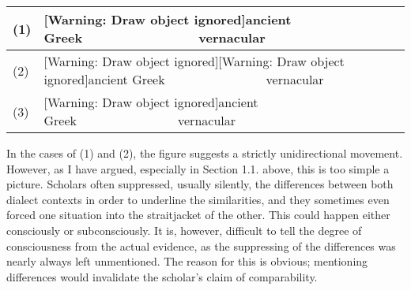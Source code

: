 \documentclass[12pt]{article}
\newenvironment{styleStandard}{\renewcommand\baselinestretch{1.25}\setlength\leftskip{0in}\setlength\rightskip{0in}\setlength\parindent{0.1972in}\setlength\parfillskip{0pt plus 1fil}\setlength\parskip{0in plus 1pt}\writerlistparindent\writerlistleftskip\leavevmode\normalfont\normalsize\writerlistlabel\ignorespaces}{\unskip\vspace{0in plus 1pt}\par}
\newcommand\writerlistleftskip{}
\newcommand\writerlistparindent{}
\newcommand\writerlistlabel{}
\begin{document}
\begin{flushleft}
\tablefirsthead{}
\tablehead{}
\tabletail{}
\tablelasttail{}
\begin{supertabular}{|m{0.35805985in}|m{5.48516in}|}
\hline
(1) &
[Warning: Draw object ignored]ancient Greek\ \ \ \ \ \ \ \ \ \ \ \ \ \ \ \ vernacular\\\hline
(2) &
[Warning: Draw object ignored][Warning: Draw object ignored]ancient Greek\ \ \ \ \ \ \ \ \ \ \ \ \ \ \ \ vernacular\\\hline
(3) &
[Warning: Draw object ignored]ancient Greek\ \ \ \ \ \ \ \ \ \ \ \ \ \ \ \ vernacular\\\hline
\end{supertabular}
\end{flushleft}
\begin{styleStandard}
In the cases of (1) and (2), the figure suggests a strictly unidirectional movement. However, as I have argued, especially in Section 1.1. above, this is too simple a picture. Scholars often suppressed, usually silently, the differences between both dialect contexts in order to underline the similarities, and they sometimes even forced one situation into the straitjacket of the other. This could happen either consciously or subconsciously. It is, however, difficult to tell the degree of consciousness from the actual evidence, as the suppressing of the differences was nearly always left unmentioned. The reason for this is obvious; mentioning differences would invalidate the scholar’s claim of comparability.
\end{styleStandard}
\end{document}
